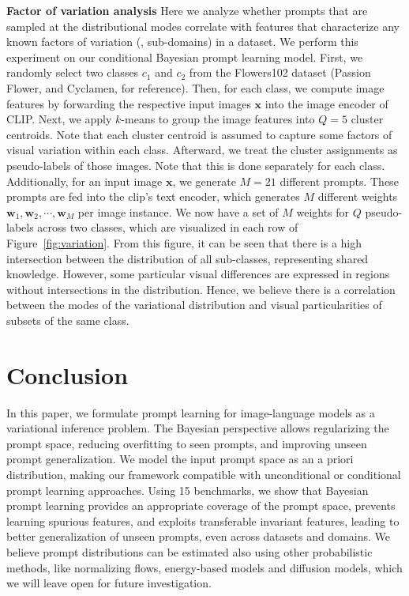 \documentclass[10pt,twocolumn,letterpaper]{article}
\newcommand{\x}{\mathbf{x}}
\newcommand{\w}{\mathbf{w}}
\begin{document}
\textbf{Factor of variation analysis}
Here we analyze whether prompts that are sampled at the distributional modes correlate with features that characterize any known factors of variation (\eg, sub-domains) in a dataset. We perform this experiment on our conditional Bayesian prompt learning model.
First, we randomly select two classes
$c_1$ and $c_2$
from the Flowers102 dataset (Passion Flower, and Cyclamen, for reference). Then, for each class, we compute image features by forwarding the respective input images $\x$ into the image encoder of CLIP. Next, we apply $k$-means to group the image features into $Q{=}5$ cluster centroids. Note that each cluster centroid is assumed to capture some factors of visual variation within each class. Afterward, we treat the cluster assignments as pseudo-labels of those images. Note that this is done separately for each class. Additionally, for an input image $\x$, we generate $M{=}21$ different prompts. These prompts are fed into the clip's text encoder, which generates $M$ different weights $\w_{1}, \w_{2}, \cdots, \w_{M}$ per image instance. We now have a set of $M$ weights for $Q$ pseudo-labels across two classes, which are visualized in each row of Figure~\ref{fig:variation}. 
From this figure, it can be seen that there is a high intersection between the distribution of all sub-classes, representing shared knowledge. However, some particular visual differences are expressed in regions without intersections in the distribution. Hence, we believe there is a correlation between the modes of the variational distribution and visual particularities of subsets of the same class. 



 \section{Conclusion}
\vspace{-0.5em}

In this paper, we formulate prompt learning for image-language models as a variational inference problem. The Bayesian perspective allows regularizing the prompt space, reducing overfitting to seen prompts, and improving unseen prompt generalization. We model the input prompt space as an a priori distribution, making our framework compatible with unconditional or conditional prompt learning approaches. Using 15 benchmarks, we show that Bayesian prompt learning provides an appropriate coverage of the prompt space, prevents learning spurious features, and exploits transferable invariant features, leading to better generalization of unseen prompts, even across datasets and domains.
We believe prompt distributions can be estimated also using other probabilistic methods, like normalizing flows, energy-based models and diffusion models, 
which we will leave open for future investigation. 
\end{document}
